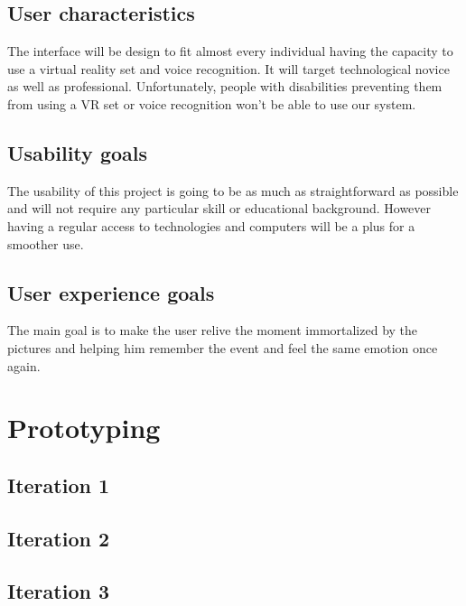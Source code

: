 \documentclass[11pt,a4paper]{article}
\begin{document}
\subsection{User characteristics}
The interface will be design to fit almost every individual having the capacity to use a virtual reality set and voice recognition. It will target technological novice as well as professional. Unfortunately, people with disabilities preventing them from using a VR set or voice recognition won't be able to use our system.

\subsection{Usability goals}

The usability of this project is going to be as much as straightforward as possible and will not require any particular skill or educational background. However having a regular access to technologies and computers will be a plus for a smoother use. 

\subsection{User experience goals}

The main goal is to make the user relive the moment immortalized by the pictures and helping him remember the event and feel the same emotion once again.

\section{Prototyping}

\subsection{Iteration 1}


\subsection{Iteration 2}


\subsection{Iteration 3}
\end{document}
